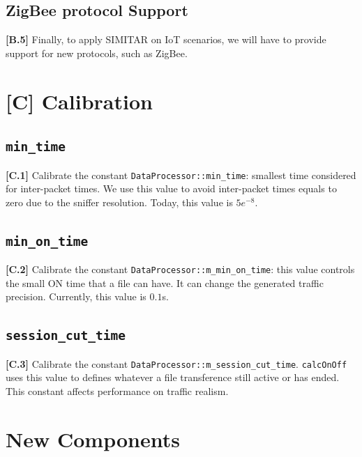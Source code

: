 \subsection{ZigBee protocol Support}

\textbf{[B.5]} Finally, to apply SIMITAR on IoT scenarios, we will have to provide support for new protocols, such as ZigBee\cite{zigbee}.



\section{[C] Calibration}


\subsection{ \texttt{min\_time}}

\textbf{[C.1]} Calibrate the constant \texttt{DataProcessor::min\_time}: smallest time considered for inter-packet times. We use this value to avoid inter-packet times equals to zero due to the sniffer resolution. Today, this value is $5e^{-8}$.

\subsection{\texttt{min\_on\_time}}

\textbf{[C.2]} Calibrate the constant \texttt{DataProcessor::m\_min\_on\_time}: this value controls the small ON time that a file can have. It can change the generated traffic precision. Currently, this value is $0.1$s. 

\subsection{\texttt{session\_cut\_time}}

\textbf{[C.3]} Calibrate the constant \texttt{DataProcessor::m\_session\_cut\_time}. \texttt{calcOnOff} uses this value to defines whatever a file transference still active or has ended.  This constant affects performance on traffic realism. 



\section{New Components}


